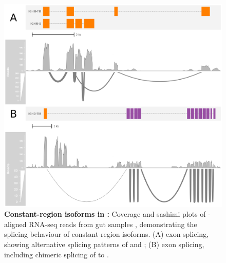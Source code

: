 	\begin{figure}
	\centering
		\begin{subfigure}{0em}
        \label{fig:nfu-locus-sashimi-a}
    \end{subfigure}
    \begin{subfigure}{0em}
        \label{fig:nfu-locus-sashimi-b}
    \end{subfigure}
	\includegraphics[width=\textwidth]{_Figures/png/nfu-locus-sashimi}
	\caption[Constant-region isoforms in \Nfu]{\textbf{Constant-region isoforms in \Nfu:} Coverage and sashimi plots of -aligned RNA-seq reads from \Nfu gut samples \parencite{smith2017microbiota}, demonstrating the splicing behaviour of  constant-region isoforms. (A)  exon splicing, showing alternative splicing patterns of  and ; (B)  exon splicing, including chimeric splicing of  to .}
	\label{fig:nfu-locus-sashimi}
	\end{figure}
	
